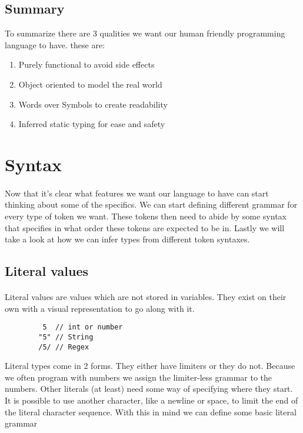 \documentclass{scrartcl}
\begin{document}
    \subsection{Summary}
    To summarize there are 3 qualities we want our human friendly programming
    language to have. these are:
    \begin{enumerate}
        \item Purely functional to avoid side effects
        \item Object oriented to model the real world
        \item Words over Symbols to create readability
        \item Inferred static typing for ease and safety
    \end{enumerate}
    \newpage

    \section{Syntax}
    \paragraph{}
    Now that it's clear what features we want our language to have can start thinking
    about some of the specifics. We can start defining different grammar for every 
    type of token we want. These tokens then need to abide by some syntax that specifies
    in what order these tokens are expected to be in. Lastly we will take a look at how
    we can infer types from different token syntaxes.

    \subsection{Literal values}
    \paragraph{}
    Literal values are values which are not stored in variables. They exist on their own
    with a visual representation to go along with it. 
    \begin{lstlisting}
         5  // int or number
        "5" // String
        /5/ // Regex
    \end{lstlisting}
    Literal types come in 2 forms. They either have limiters or they do not. Because we
    often program with numbers we assign the limiter-less grammar to the numbers.
    Other literals (at least) need some way of specifying where they start. It is possible
    to use another character, like a newline or space, to limit the end of the literal
    character sequence. With this in mind we can define some basic literal grammar
\end{document}
